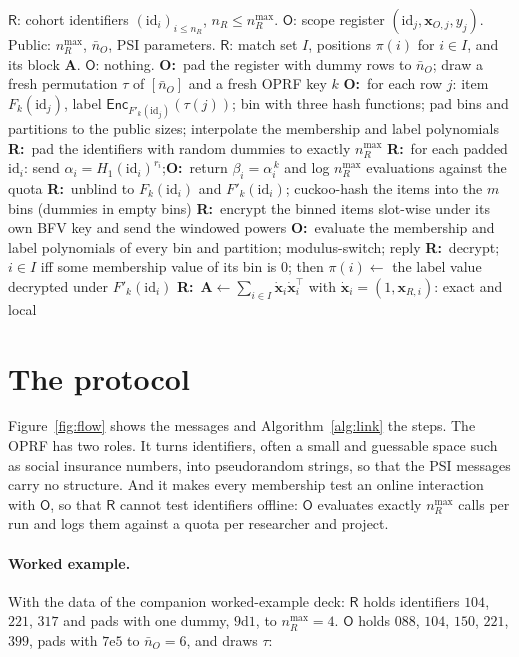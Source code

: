 \documentclass[10pt]{article}
\newcommand{\Rp}{\mathsf{R}}
\newcommand{\Op}{\mathsf{O}}
\newcommand{\nR}{n_R^{\max}}
\newcommand{\nO}{\bar n_O}
\newcommand{\Enc}{\mathsf{Enc}}
\newcommand{\Rdo}{\textbf{\textcolor{blue!60!black}{R:}}\ }
\newcommand{\Odo}{\textbf{\textcolor{orange!75!black}{O:}}\ }
\begin{document}
\begin{algorithm}[t]
\caption{Phase 1: link}\label{alg:link}
\begin{algorithmic}[1]
\Require $\Rp$: cohort identifiers $(\mathrm{id}_i)_{i\le n_R}$, $n_R\le\nR$. $\Op$: scope register $(\mathrm{id}_j,\mathbf x_{O,j},y_j)$. Public: $\nR$, $\nO$, PSI parameters.
\Ensure $\Rp$: match set $I$, positions $\pi(i)$ for $i\in I$, and its block $\mathbf A$. $\Op$: nothing.
\State \Odo pad the register with dummy rows to $\nO$; draw a fresh permutation $\tau$ of $[\nO]$ and a fresh OPRF key $k$
\State \Odo for each row $j$: item $F_k(\mathrm{id}_j)$, label $\Enc_{F'_k(\mathrm{id}_j)}(\tau(j))$; bin with three hash functions; pad bins and partitions to the public sizes; interpolate the membership and label polynomials
\State \Rdo pad the identifiers with random dummies to exactly $\nR$
\State \Rdo for each padded $\mathrm{id}_i$: send $\alpha_i=H_1(\mathrm{id}_i)^{r_i}$;\quad \Odo return $\beta_i=\alpha_i^{\,k}$ and log $\nR$ evaluations against the quota
\State \Rdo unblind to $F_k(\mathrm{id}_i)$ and $F'_k(\mathrm{id}_i)$; cuckoo-hash the items into the $m$ bins (dummies in empty bins)
\State \Rdo encrypt the binned items slot-wise under its own BFV key and send the windowed powers
\State \Odo evaluate the membership and label polynomials of every bin and partition; modulus-switch; reply
\State \Rdo decrypt; $i\in I$ iff some membership value of its bin is $0$; then $\pi(i)\gets$ the label value decrypted under $F'_k(\mathrm{id}_i)$
\State \Rdo $\mathbf A\gets\sum_{i\in I}\dot{\mathbf x}_i\dot{\mathbf x}_i^\top$ with $\dot{\mathbf x}_i=(1,\mathbf x_{R,i})$: exact and local
\end{algorithmic}
\end{algorithm}

\section{The protocol}

Figure~\ref{fig:flow} shows the messages and Algorithm~\ref{alg:link} the steps. The OPRF has two roles. It turns identifiers, often a small and guessable space such as social insurance numbers, into pseudorandom strings, so that the PSI messages carry no structure. And it makes every membership test an online interaction with $\Op$, so that $\Rp$ cannot test identifiers offline: $\Op$ evaluates exactly $\nR$ calls per run and logs them against a quota per researcher and project.

\paragraph{Worked example.} With the data of the companion worked-example deck: $\Rp$ holds identifiers $104$, $221$, $317$ and pads with one dummy, $9\mathrm{d}1$, to $\nR=4$. $\Op$ holds $088$, $104$, $150$, $221$, $399$, pads with $7\mathrm{e}5$ to $\nO=6$, and draws $\tau$:
\end{document}
